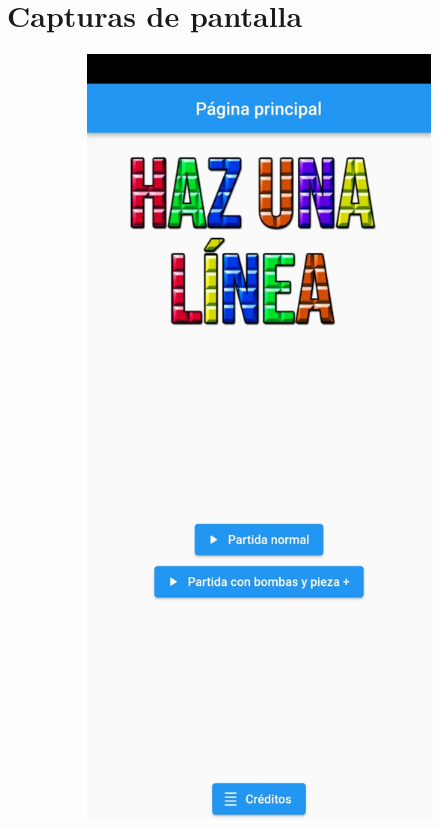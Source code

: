 \documentclass{article}
\begin{document}
\section{Capturas de pantalla}
\begin{figure}[H]
  \begin{subfigure}{0.5\textwidth}
          \includegraphics[width=\textwidth]{imagenes/captura7.jpeg}

\end{subfigure}
\end{figure}
\end{document}
